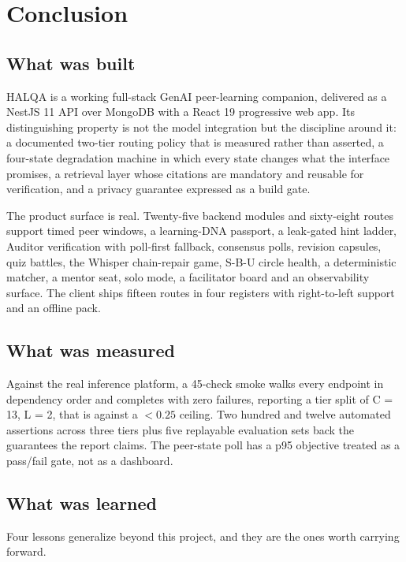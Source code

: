 \chapter{Conclusion}
\label{ch:conclusion}

\section{What was built}

HALQA is a working full-stack GenAI peer-learning companion, delivered as a NestJS 11 API
over MongoDB with a React 19 progressive web app. Its distinguishing property is not the
model integration but the discipline around it: a documented two-tier routing policy that is
measured rather than asserted, a four-state degradation machine in which every state changes
what the interface promises, a retrieval layer whose citations are mandatory and reusable
for verification, and a privacy guarantee expressed as a build gate.

The product surface is real. Twenty-five backend modules and sixty-eight routes support
timed peer windows, a learning-DNA passport, a leak-gated hint ladder, Auditor verification
with poll-first fallback, consensus polls, revision capsules, quiz battles, the Whisper
chain-repair game, S-B-U circle health, a deterministic matcher, a mentor seat, solo mode,
a facilitator board and an observability surface. The client ships fifteen routes in four
registers with right-to-left support and an offline pack.

\section{What was measured}

Against the real inference platform, a 45-check smoke walks every endpoint in dependency
order and completes with zero failures, reporting a tier split of C = 13, L = 2, that is
 against a $<0.25$ ceiling. Two hundred and twelve automated
assertions across three tiers plus five replayable evaluation sets back the guarantees the
report claims. The peer-state poll has a p95 objective treated as a pass/fail gate, not as a
dashboard.

\section{What was learned}

Four lessons generalize beyond this project, and they are the ones worth carrying forward.


